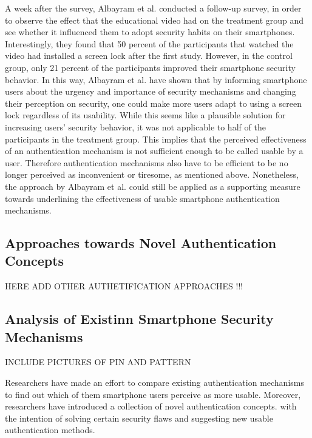 A week after the survey, Albayram et al. \cite{Albayram:2017:BUL:3235924.3235929} conducted a follow-up survey, in order to observe the effect that the educational video had on the treatment group and see whether it influenced them to adopt security habits on their smartphones.
Interestingly, they found that 50 percent of the participants that watched the video had installed a screen lock after the first study. However, in the control group, only 21 percent of the participants improved their smartphone security behavior. In this way, Albayram et al. \cite{Albayram:2017:BUL:3235924.3235929} have shown that by informing smartphone users about the urgency and importance of security mechanisms and changing their perception on security, one could make more users adapt to using a screen lock regardless of its usability. While this seems like a plausible solution for increasing users' security behavior, it was not applicable to half of the participants in the treatment group. This implies that the perceived effectiveness of an authentication mechanism is not sufficient enough to be called usable by a user. Therefore authentication mechanisms also have to be efficient to be no longer perceived as inconvenient or tiresome, as mentioned above. Nonetheless, the approach by Albayram et al. \cite{Albayram:2017:BUL:3235924.3235929} could still be applied as a supporting measure towards underlining the effectiveness of usable smartphone authentication mechanisms.  

\subsection{Approaches towards Novel Authentication Concepts}

HERE ADD OTHER AUTHETIFICATION APPROACHES !!!

\subsection{Analysis of Existinn Smartphone Security Mechanisms} \label{2.2.2}

INCLUDE PICTURES OF PIN AND PATTERN

Researchers have made an effort to compare existing authentication mechanisms to find out which of them smartphone users perceive as more usable. Moreover, researchers have introduced a collection of novel authentication concepts. with the intention of solving certain security flaws and suggesting new usable authentication methods. \\

